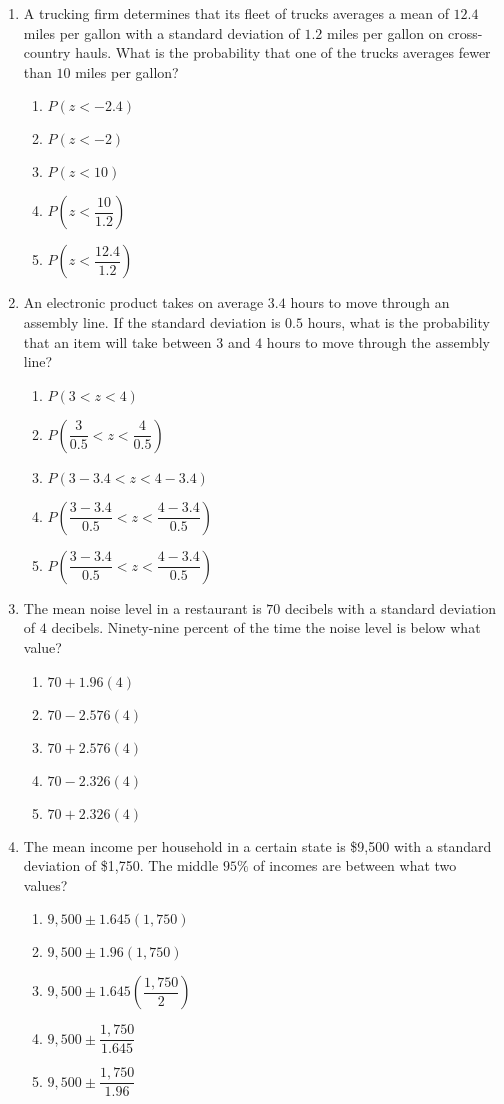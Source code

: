\documentclass{article}
\begin{document}
\begin{enumerate}
\item A trucking firm determines that its fleet of trucks averages a mean of $12.4$ miles per gallon with a standard deviation of $1.2$ miles per gallon on cross-country hauls. What is the probability that one of the trucks averages fewer than $10$ miles per gallon? 
\begin{enumerate}
  \item $P\!\left(z<-2.4\right)$
  \item $P\!\left(z<-2\right)$
  \item $P\!\left(z<10\right)$
  \item $P\!\left(z<\dfrac{10}{1.2}\right)$
  \item $P\!\left(z<\dfrac{12.4}{1.2}\right)$
\end{enumerate}

\item An electronic product takes on average $3.4$ hours to move through an assembly line. If the standard deviation is $0.5$ hours, what is the probability that an item will take between $3$ and $4$ hours to move through the assembly line? 
\begin{enumerate}
  \item $P(3<z<4)$
  \item $P\!\left(\dfrac{3}{0.5}<z<\dfrac{4}{0.5}\right)$
  \item $P(3-3.4<z<4-3.4)$
  \item $P\!\left(\dfrac{3-3.4}{\,0.5\,}<z<\dfrac{4-3.4}{\,0.5\,}\right)$
  \item $P\!\left(\dfrac{3-3.4}{0.5}<z<\dfrac{4-3.4}{0.5}\right)$
\end{enumerate}

\item The mean noise level in a restaurant is $70$ decibels with a standard deviation of $4$ decibels. Ninety-nine percent of the time the noise level is below what value? 
\begin{enumerate}
  \item $70+1.96(4)$
  \item $70-2.576(4)$
  \item $70+2.576(4)$
  \item $70-2.326(4)$
  \item $70+2.326(4)$
\end{enumerate}

\item The mean income per household in a certain state is \$9,500 with a standard deviation of \$1,750. The middle $95\%$ of incomes are between what two values? 
\begin{enumerate}
  \item $9{,}500 \pm 1.645(1{,}750)$
  \item $9{,}500 \pm 1.96(1{,}750)$
  \item $9{,}500 \pm 1.645\!\left(\dfrac{1{,}750}{2}\right)$
  \item $9{,}500 \pm \dfrac{1{,}750}{1.645}$
  \item $9{,}500 \pm \dfrac{1{,}750}{1.96}$
\end{enumerate}


\end{enumerate}
\end{document}
